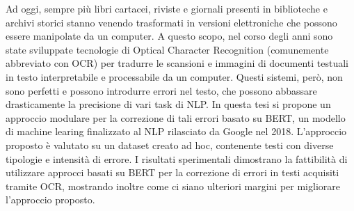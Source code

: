 Ad oggi, sempre più libri cartacei, riviste e giornali presenti in biblioteche e archivi storici stanno venendo trasformati in versioni elettroniche che possono essere manipolate da un computer. A questo scopo, nel corso degli anni sono state sviluppate tecnologie di Optical Character Recognition (comunemente abbreviato con OCR) per tradurre le scansioni e immagini di documenti testuali in testo interpretabile e processabile da un computer. Questi sistemi, però, non sono perfetti e possono introdurre errori nel testo, che possono abbassare drasticamente la precisione di vari task di NLP. In questa tesi si propone un approccio modulare per la correzione di tali errori basato su BERT, un modello di machine learing finalizzato al NLP rilasciato da Google nel 2018. L'approccio proposto è valutato su un dataset creato ad hoc, contenente testi con diverse tipologie e intensità di errore.  I risultati sperimentali dimostrano la fattibilità di utilizzare approcci basati su BERT per la correzione di errori in testi acquisiti tramite OCR, mostrando inoltre come ci siano ulteriori margini per migliorare l'approccio proposto.